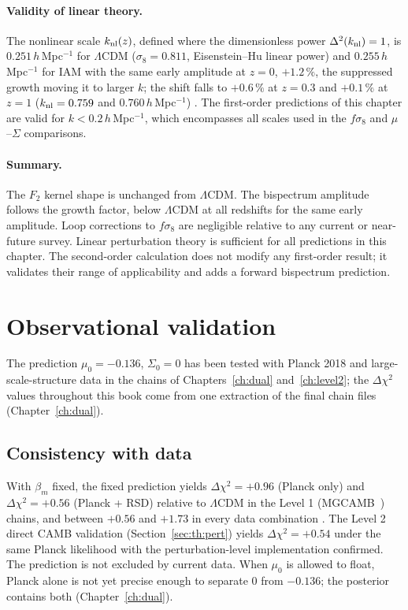 \paragraph{Validity of linear theory.} The nonlinear scale $k_{\rm nl}(z)$, defined where the dimensionless power $\Delta^2(k_{\rm nl})=1$, is
$0.251\,h$\,Mpc$^{-1}$ for $\Lambda$CDM ($\sigma_8=0.811$, Eisenstein--Hu linear power) and $0.255\,h$\,Mpc$^{-1}$ for IAM with the same early amplitude at
$z=0$, $+1.2\,\%$, the suppressed growth moving it to larger $k$; the shift falls to $+0.6\,\%$ at $z=0.3$ and $+0.1\,\%$ at $z=1$
($k_{\rm nl}=0.759$ and $0.760\,h$\,Mpc$^{-1}$) \calc. The first-order predictions of this chapter are valid for $k<0.2\,h$\,Mpc$^{-1}$, which encompasses all
scales used in the $f\sigma_8$ and $\mu$--$\Sigma$ comparisons.

\paragraph{Summary.} The $F_2$ kernel shape is unchanged from $\Lambda$CDM. The bispectrum amplitude follows the growth factor, below $\Lambda$CDM at all
redshifts for the same early amplitude. Loop corrections to $f\sigma_8$ are negligible relative to any current or near-future survey. Linear
perturbation theory is sufficient for all predictions in this chapter. The second-order calculation does not modify any first-order result; it
validates their range of applicability and adds a forward bispectrum prediction.

\section{Observational validation}\label{sec:th:obs}
The prediction $\mu_0=-0.136$, $\Sigma_0=0$ has been tested with Planck 2018 and large-scale-structure data in the chains of Chapters~\ref{ch:dual}
and~\ref{ch:level2}; the $\Delta\chi^2$ values throughout this book come from one extraction of the final chain files (Chapter~\ref{ch:dual}).

\subsection{Consistency with data}
With $\beta_m$ fixed, the fixed prediction yields $\Delta\chi^2=+0.96$ (Planck only) and $\Delta\chi^2=+0.56$ (Planck + RSD) relative to $\Lambda$CDM in the Level 1
(MGCAMB~\cite{Zhao2009MGCAMB,Wang2023MGCAMB}) chains, and between $+0.56$ and $+1.73$ in every data combination \measured. The Level 2 direct CAMB validation
(Section~\ref{sec:th:pert}) yields $\Delta\chi^2=+0.54$ under the same Planck likelihood with the perturbation-level implementation confirmed. The prediction is not
excluded by current data. When $\mu_0$ is allowed to float, Planck alone is not yet precise enough to separate $0$ from $-0.136$; the posterior contains both (Chapter~\ref{ch:dual}). \measured

